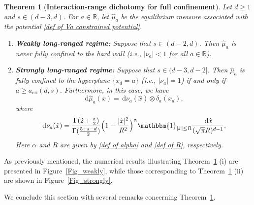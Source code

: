 \documentclass{amsart}
\def\wh{\widehat}
\def\R{\mathbb{R}}
\newcommand{\ud}{\, \mathrm{d}}
\theoremstyle{plain}
\newtheorem{thm}{Theorem}[section]
\theoremstyle{remark}
\numberwithin{equation}{section}
\begin{document}
\begin{thm}[\textbf{Interaction-range dichotomy for full confinement}] \label{thm: fully confined}
Let $d\geq 1$ and $s\in(d-3,d)$. For $a \in \R$, let $\wh \mu_a $ be the equilibrium measure associated with the potential \eqref{def of Va constrained potential}.  

\begin{enumerate}[label=\textup{(\roman*)}]
\item \label{thm: fully confined weak}
\textup{\textbf{Weakly long-ranged regime:}}
Suppose that $s\in(d-2,d)$. Then $\widehat{\mu}_a$ is never fully confined to the hard wall (i.e., $ |\nu_a|<1$ for all $a \in \R$). 

\smallskip

\item
\textup{\textbf{Strongly long-ranged regime:}} \label{thm: fully confined strong}
Suppose that $s\in(d-3,d-2]$. Then $\widehat{\mu}_a$ is fully confined to the hyperplane $\{x_d=a\}$ (i.e., $  |\nu_a|=1$) if and only if $a\ge a_{\mathrm{cri}}(d,s)$.  
Furthermore, in this case, we have 
\begin{equation}
    \ud\widehat{\mu}_a(x)
    =
    \ud \nu_a(\hat{x})\otimes \delta_a(x_d),
\end{equation}
where
\begin{equation} \label{def of fully singular msr}
   \ud\nu_a(\hat{x})
    =  \frac{
    \Gamma(2+\tfrac{s}{2})
    }{
    \Gamma(\tfrac{5+s-d}{2})
    }
    \Big(
    1-\frac{|\hat{x}|^2}{R^2}
    \Big)^{ \alpha }
    \mathbbm{1}_{|\hat{x}|\le R}
    \frac{\ud\hat{x}}
    {(\sqrt{\pi}R)^{d-1}}.  
\end{equation}
Here  $\alpha$ and $R$ are given by \eqref{def of alpha} and \eqref{def of R}, respectively.  
\end{enumerate}
\end{thm}

As previously mentioned, the numerical results illustrating Theorem~\ref{thm: fully confined} (i) are presented in Figure~\ref{Fig_weakly}, while those corresponding to Theorem~\ref{thm: fully confined} (ii) are shown in Figure~\ref{Fig_strongly}. 


We conclude this section with several remarks concerning Theorem~\ref{thm: fully confined}. 
\end{document}
